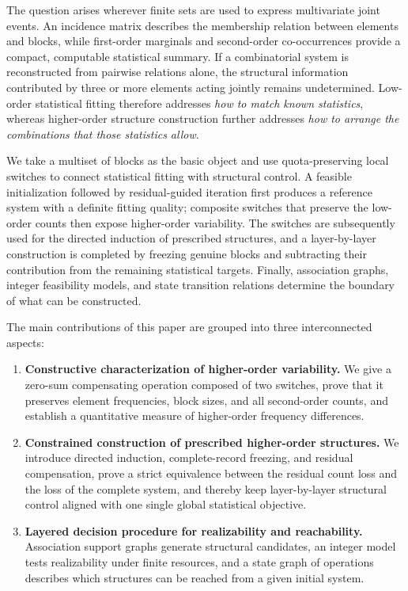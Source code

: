 \documentclass[11pt,a4paper]{article}
\numberwithin{equation}{section}
\theoremstyle{definition}
\numberwithin{algorithm}{section}
\begin{document}
The question arises wherever finite sets are used to express multivariate joint events.
An incidence matrix describes the membership relation between elements and blocks,
while first-order marginals and second-order co-occurrences provide a compact,
computable statistical summary.
If a combinatorial system is reconstructed from pairwise relations alone,
the structural information contributed by three or more elements acting jointly
remains undetermined.
Low-order statistical fitting therefore addresses \emph{how to match known statistics},
whereas higher-order structure construction further addresses
\emph{how to arrange the combinations that those statistics allow}.

We take a multiset of blocks as the basic object and use quota-preserving local switches
to connect statistical fitting with structural control.
A feasible initialization followed by residual-guided iteration first produces a reference
system with a definite fitting quality;
composite switches that preserve the low-order counts then expose higher-order variability.
The switches are subsequently used for the directed induction of prescribed structures,
and a layer-by-layer construction is completed by freezing genuine blocks and subtracting
their contribution from the remaining statistical targets.
Finally, association graphs, integer feasibility models, and state transition relations
determine the boundary of what can be constructed.

The main contributions of this paper are grouped into three interconnected aspects:
\begin{enumerate}[leftmargin=2.2em,itemsep=0.25em]
\item \textbf{Constructive characterization of higher-order variability.}
We give a zero-sum compensating operation composed of two switches, prove that it preserves
element frequencies, block sizes, and all second-order counts, and establish a quantitative
measure of higher-order frequency differences.
\item \textbf{Constrained construction of prescribed higher-order structures.}
We introduce directed induction, complete-record freezing, and residual compensation,
prove a strict equivalence between the residual count loss and the loss of the complete
system, and thereby keep layer-by-layer structural control aligned with one single global
statistical objective.
\item \textbf{Layered decision procedure for realizability and reachability.}
Association support graphs generate structural candidates, an integer model tests
realizability under finite resources, and a state graph of operations describes which
structures can be reached from a given initial system.
\end{enumerate}
\end{document}
